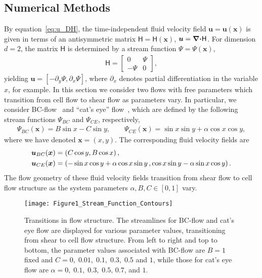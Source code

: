 \documentclass[english,12pt,jmp,graphicx]{revtex4-1}
\newcommand{\vecu}{\boldsymbol{u}}
\newcommand{\vecx}{\boldsymbol{x}}
\newcommand{\bnabla}{\mbox{\boldmath${\nabla}$}}
\newcommand{\bcdot}{\mbox{\boldmath${\cdot}$}}
\newcommand{\Hm}{\mathsf{H}}
\begin{document}
\subsection{Numerical Methods}\label{sec:Numerical_Methods}
%
By equation~\eqref{eq:u_DH}, the time-independent fluid velocity field
$\vecu=\vecu(\vecx)$ is given in terms of an antisymmetric matrix
$\Hm=\Hm(\vecx)$, $\vecu=\bnabla\bcdot\Hm$. For dimension $d=2$, the
matrix $\Hm$ is determined by a stream function $\Psi=\Psi(\vecx)$,   
%
\begin{align}\label{eq:H_2D}
  \Hm=
  \left[
  \begin{array}{cc}
    0&\Psi\\
    -\Psi&0  
    \end{array}
\right],
\end{align}
%
yielding $\vecu=[-\partial_y\Psi,\partial_x\Psi]$, where $\partial_x$ denotes
partial differentiation in the variable $x$, for example. In this
section we consider two flows with free parameters which transition
from cell flow to shear flow as parameters vary. In particular, we
consider  BC-flow~\cite{Biferale:PF:2725} and ``cat's eye''
flow~\cite{Fannjiang:1994:SIAM_JAM:333}, which are defined by the
following stream functions $\Psi_{BC}$ and $\Psi_{CE}$, respectively,    
%
\begin{align}\label{eq:Stream_Functions}
  \Psi_{BC}(\vecx)=B\sin{x}-C\sin{y},
  \qquad
  \Psi_{CE}(\vecx)=\sin{x}\sin{y}+\alpha\cos{x}\cos{y},
\end{align}
%
where we have denoted $\vecx=(x,y)$. The corresponding fluid velocity
fields are 
%
\begin{align}\label{eq:BC_CE_velocity_fields}
  \vecu_{BC}(\vecx)&=(C\cos{y},B\cos{x})\,,
  \\
  \vecu_{CE}(\vecx)&=(-\sin{x}\cos{y}+\alpha\cos{x}\sin{y}\,,
            \cos{x}\sin{y}-\alpha\sin{x}\cos{y})\,.
  \notag
\end{align}
%
The flow geometry of these fluid velocity fields transition from shear
flow to cell flow structure as the system parameters $\alpha,B,C\in[0,1]$
vary.


%
%
\begin{figure}[t]
  \centerline{\texttt{[image: Figure1\_Stream\_Function\_Contours]}} 
\caption{%
  Transitions in flow structure. The streamlines
  for BC-flow and cat's eye flow are displayed for various
  parameter values, transitioning from shear to cell flow
  structure. From left to right and top to bottom, the parameter
  values associated with BC-flow are $B=1$ fixed
  and $C=0,\;0.01,\;0.1,\;0.3,\;0.5$ and $1$, while those for cat's
  eye flow are $\alpha=0,\;0.1,\;0.3,\;0.5,\,0.7$, and $1$. 
        }
\label{fig:Figure1_Stream_Function_Contours}
\end{figure}
%
\end{document}
